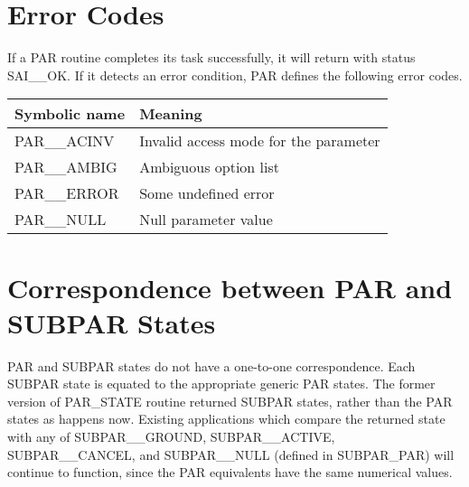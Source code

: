 \documentclass[twoside,11pt]{article}
\newcommand{\xlabel}[1]{}
\begin{document}
\section{\xlabel{error_codes}Error Codes}

If a PAR routine completes its task successfully, it will return with
status SAI\_\_OK.  If it detects an error condition, PAR defines the
following error codes.

\begin{center}
\begin{tabular}{|ll|}
\hline
Symbolic name & Meaning \\ \hline
PAR\_\_ACINV & Invalid access mode for the parameter \\
PAR\_\_AMBIG & Ambiguous option list \\
PAR\_\_ERROR & Some undefined error \\
PAR\_\_NULL & Null parameter value \\ \hline
\end{tabular}
\end{center}

\newpage
\section{\xlabel{correspondence_between_par_and_subpar_states}Correspondence between PAR and SUBPAR States}

PAR and SUBPAR states do not have a one-to-one correspondence.  Each
SUBPAR state is equated to the appropriate generic PAR states.  The
former version of PAR\_STATE routine returned SUBPAR states, rather than
the PAR states as happens now.  Existing applications which compare the
returned state with any of SUBPAR\_\_GROUND, SUBPAR\_\_ACTIVE,
SUBPAR\_\_CANCEL, and SUBPAR\_\_NULL (defined in SUBPAR\_PAR) will
continue to function, since the PAR equivalents have the same numerical
values. 
\end{document}
